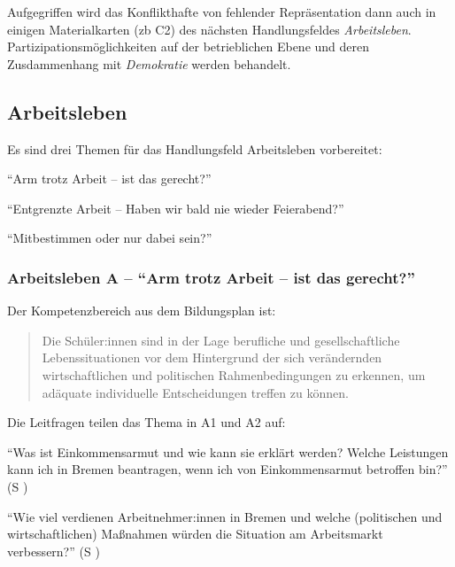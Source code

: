 Aufgegriffen wird das Konflikthafte von fehlender Repräsentation dann auch in einigen Materialkarten (\gls{zb} C2) des nächsten Handlungsfeldes \emph{Arbeitsleben}. Partizipationsmöglichkeiten auf der betrieblichen Ebene und deren Zusdammenhang mit \emph{Demokratie} werden behandelt. 



\subsection{Arbeitsleben}
Es sind drei Themen für das Handlungsfeld Arbeitsleben vorbereitet:
\begin{myenumerate}
    \item \enquote{Arm trotz Arbeit – ist das gerecht?}
    \item \enquote{Entgrenzte Arbeit – Haben wir bald nie wieder Feierabend?}
    \item \enquote{Mitbestimmen oder nur dabei sein?}
\end{myenumerate}



\subsubsection{Arbeitsleben A -- \enquote{Arm trotz Arbeit – ist das gerecht?}}
Der Kompetenzbereich aus dem Bildungsplan ist: 
\begin{quotation}
    Die Schüler:innen sind in der Lage berufliche und gesellschaftliche Lebenssituationen vor dem Hintergrund der sich verändernden wirtschaftlichen und politischen Rahmenbedingungen zu erkennen, um adäquate individuelle Entscheidungen treffen zu können.

    \autocite[18]{bplan}
\end{quotation}

Die Leitfragen teilen das Thema in A1 und A2 auf: 
\begin{myenumerate}
    \item \enquote{Was ist Einkommensarmut und wie kann sie erklärt werden? Welche Leistungen kann ich in Bremen beantragen, wenn ich von Einkommensarmut betroffen bin?} (\gls{S} \pageref{ARBEITSLEBEN-A1})
    \item \enquote{Wie viel verdienen Arbeitnehmer:innen in Bremen und welche (politischen und wirtschaftlichen) Maßnahmen würden die Situation am Arbeitsmarkt verbessern?}  (\gls{S} \pageref{ARBEITSLEBEN-A2})
\end{myenumerate}

